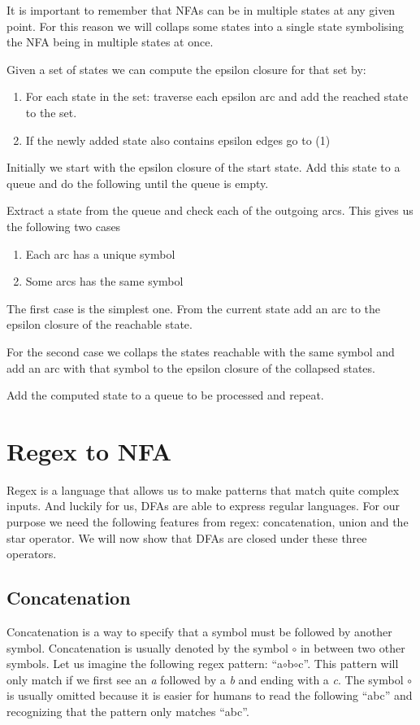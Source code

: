 It is important to remember that NFAs can be in multiple states at any given point. For this reason we will collaps some states into a single state symbolising the NFA being in multiple states at once.

Given a set of states we can compute the epsilon closure for that set  by:
\begin{enumerate}
      \item For each state in the set: traverse each epsilon arc and add the reached state to the set.
      \item If the newly added state also contains epsilon edges go to (1)
\end{enumerate}


Initially we start with the epsilon closure of the start state. Add this state to a queue and do the following until the queue is empty. 

Extract a state from the queue and check each of the outgoing arcs. This gives us the following two cases
\begin{enumerate}
      \item Each arc has a unique symbol
      \item Some arcs has the same symbol
\end{enumerate}

The first case is the simplest one. From the current state add an arc to the epsilon closure of the reachable state. 

For the second case we collaps the states reachable with the same symbol and add an arc with that symbol to the epsilon closure of the collapsed states. 

Add the computed state to a queue to be processed and repeat.


\section{Regex to NFA}

Regex is a language that allows us to make patterns that match quite complex inputs. And luckily for us, DFAs are able to express regular languages. For our purpose we need the following features from regex: concatenation, union and the star operator. We will now show that DFAs are closed under these three operators. 

\subsection{Concatenation}
Concatenation is a way to specify that a symbol must be followed by another symbol. Concatenation is usually denoted by the symbol $\circ$ in between two other symbols. Let us imagine the following regex pattern: ``a$\circ$b$\circ$c''. This pattern will only match if we first see an \textit{a} followed by a \textit{b} and ending with a \textit{c}. The symbol $\circ$ is usually omitted because it is easier for humans to read the following ``abc'' and recognizing that the pattern only matches ``abc''.

